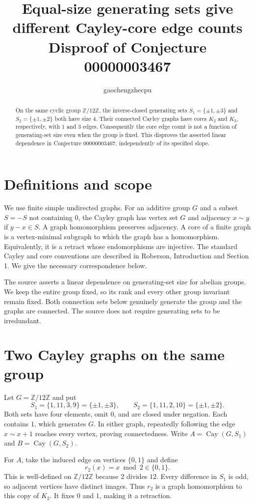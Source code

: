 \documentclass[11pt]{article}
\title{Equal-size generating sets give\\different Cayley-core edge counts\\
\large Disproof of Conjecture 00000003467}
\author{gaochengzhecpu}\date{}
\newcommand{\Z}{\mathbb Z}
\begin{document}
\maketitle
\begin{abstract}
On the same cyclic group $\Z/12\Z$, the inverse-closed generating sets
$S_1=\{\pm1,\pm3\}$ and $S_2=\{\pm1,\pm2\}$ both have size $4$.
Their connected Cayley graphs have cores $K_2$ and $K_3$, respectively,
with $1$ and $3$ edges. Consequently the core edge count is not a
function of generating-set size even when the group is fixed.
This disproves the asserted linear dependence in Conjecture 00000003467,
independently of its specified slope.
\end{abstract}

\section*{Definitions and scope}
We use finite simple undirected graphs. For an additive group $G$ and
a subset $S=-S$ not containing $0$, the Cayley graph has vertex set
$G$ and adjacency $x\sim y$ if $y-x\in S$.
A graph homomorphism preserves adjacency. A core of a finite graph is
a vertex-minimal subgraph to which the graph has a homomorphism.
Equivalently, it is a retract whose endomorphisms are injective.
The standard Cayley and core conventions are described in Roberson,
Introduction and Section 1. We give the necessary correspondence below.

The source asserts a linear dependence on generating-set size for
abelian groups. We keep the entire group fixed, so its rank and every
other group invariant remain fixed. Both connection sets below genuinely
generate the group and the graphs are connected. The source does not
require generating sets to be irredundant.

\section*{Two Cayley graphs on the same group}
Let $G=\Z/12\Z$ and put
\[
 S_1=\{1,11,3,9\}=\{\pm1,\pm3\},\qquad
 S_2=\{1,11,2,10\}=\{\pm1,\pm2\}.
\]
Both sets have four elements, omit $0$, and are closed under negation.
Each contains $1$, which generates $G$. In either graph, repeatedly
following the edge $x\sim x+1$ reaches every vertex, proving connectedness.
Write $A=\operatorname{Cay}(G,S_1)$ and
$B=\operatorname{Cay}(G,S_2)$.

For $A$, take the induced edge on vertices $\{0,1\}$ and define
\[
 r_2(x)=x\bmod2\in\{0,1\}.
\]
This is well-defined on $\Z/12\Z$ because $2$ divides $12$.
Every difference in $S_1$ is odd, so adjacent vertices have distinct
images. Thus $r_2$ is a graph homomorphism to this copy of $K_2$.
It fixes $0$ and $1$, making it a retraction.
\end{document}
